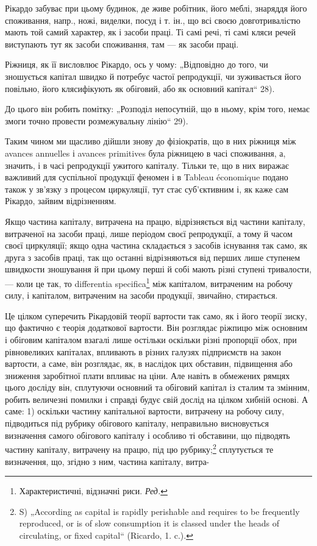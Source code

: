 Рікардо забуває при цьому будинок, де живе робітник, його меблі,
знаряддя його споживання, напр., ножі, виделки, посуд і т. ін., що всі
своєю довготривалістю мають той самий характер, як і засоби праці. Ті
самі речі, ті самі кляси речей виступають тут як засоби споживання,
там — як засоби праці.

Ріжниця, як її висловлює Рікардо, ось у чому: „Відповідно до того,
чи зношується капітал швидко й потребує частої репродукції, чи зуживається
його повільно, його клясифікують як обіговий, або як основний
капітал“ 28).

До цього він робить помітку: „Розподіл непосутній, що в ньому, крім
того, немає змоги точно провести розмежувальну лінію“ 29).

Таким чином ми щасливо дійшли знову до фізіократів, що в них
ріжниця між avances annuelles і avances primitives була ріжницею в часі
споживання, а, значить, і в часі репродукції ужитого капіталу. Тільки те,
що в них виражає важливий для суспільної продукції феномен і в Tableau
économique подано також у зв’язку з процесом циркуляції, тут стає
суб’єктивним і, як каже сам Рікардо, зайвим відрізненням.

Якщо частина капіталу, витрачена на працю, відрізняється від частини
капіталу, витраченої на засоби праці, лише періодом своєї репродукції,
а тому й часом своєї циркуляції; якщо одна частина складається з засобів
існування так само, як друга з засобів праці, так що останні відрізняються
від перших лише ступенем швидкости зношування й при цьому
перші й собі мають різні ступені тривалости, — коли це так, то differentia
specifica\footnote*{
Характеристичні, відзначні риси. \emph{Ред.}
} між капіталом, витраченим на робочу силу, і капіталом, витраченим
на засоби продукції, звичайно, стирається.

Це цілком суперечить Рікардовій теорії вартости так само, як і його
теорії зиску, що фактично є теорія додаткової вартости. Він розглядає
ріжпицю між основним і обіговим капіталом взагалі лише остільки
оскільки різні пропорції обох, при рівновеликих капіталах, впливають
в різних галузях підприємств на закон вартости, а саме, він розглядає,
як, в наслідок цих обставин, підвищення або зниження заробітної плати
впливає на ціни. Але навіть в обмежених рямцях цього досліду він, сплутуючи
основний та обіговий капітал із сталим та змінним, робить величезні
помилки і справді будує свій дослід на цілком хибній основі. А
саме: 1) оскільки частину капітальної вартости, витрачену на робочу
силу, підводиться під рубрику обігового капіталу, неправильно висновується
визначення самого обігового капіталу і особливо ті обставини,
що підводять частину капіталу, витрачену на працю, під цю рубрику;\footnote{
S) „According as capital is rapidly perishable and requires to be frequently
reproduced, or is of slow consumption it is classed under the heads of circulating,
or fixed capital“ (Ricardo, 1. c.).
} сплутується те визначення, що, згідно з ним, частина капіталу, витра-

